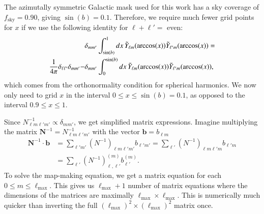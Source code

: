 \documentclass[twocolumn]{../common/aa}
\begin{document}
The azimutally symmetric Galactic mask used for this work has a sky coverage of $f_{\mathrm{sky}} = 0.90$, giving $\sin(b) = 0.1$. Therefore, we require much fewer grid points for $x$ if we use the following identity for $\ell+\ell' = $ even:
\begin{align}
&\delta_{mm'} \int_{\sin(b)}^{1} dx \, \Tilde{Y}_{\ell m}(\arccos(x)) \Tilde{Y}_{\ell' m}(\arccos(x)) = \\
\frac{1}{4\pi}\delta_{\ell \ell'}\delta_{m m'} - &\delta_{mm'} \int_{0}^{\sin(b)} dx \, \Tilde{Y}_{\ell m}(\arccos(x)) \Tilde{Y}_{\ell' m}(\arccos(x)),
\end{align}
which comes from the orthonormality condition for spherical harmonics. We now only need to grid $x$ in the interval $0\leq x \leq \sin(b) = 0.1$, as opposed to the interval $0.9 \leq x \leq 1$.

Since $N^{-1}_{\ell m \ell' m'} \propto \delta_{m m'}$, we get simplified matrix expressions. Imagine multiplying the matrix $\boldsymbol{N}^{-1} = N^{-1}_{\ell m \ell' m'}$ with the vector $\boldsymbol{b} = b_{\ell m}$
\begin{align}
\boldsymbol{N}^{-1} \cdot \boldsymbol{b} &= \sum_{\ell' m'}\left(N^{-1}\right)_{\ell m \ell' m'}b_{\ell' m'} = \sum_{\ell'}\left(N^{-1}\right)_{\ell m \ell' m}b_{\ell' m}\\
&= \sum_{\ell' }\left(N^{-1}\right)^{(m)}_{\ell, \ell'}b^{(m)}_{\ell'}.
\end{align}
To solve the map-making equation, we get a matrix equation for each $0 \leq m \leq \ell_{\mathrm{max}}$. This gives us $\ell_{\textrm{max}}+1$ number of matrix equations where the dimensions of the matrices are maximally $\ell_{\textrm{max}} \times \ell_{\textrm{max}}$. This is numerically much quicker than inverting the full $(\ell_{\textrm{max}})^2 \times (\ell_{\textrm{max}})^2$ matrix once.
\end{document}
